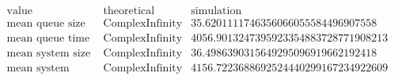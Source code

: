 \[\begin{array}{cccc}
 \text{value} & \text{theoretical} & \text{simulation} & \text{} \\
 \text{mean queue size} & \text{ComplexInfinity} & 35.6201111746356066055584496907558 & \text{} \\
 \text{mean queue time} & \text{ComplexInfinity} & 4056.9013247395923354883728771908213 & \text{} \\
 \text{mean system size} & \text{ComplexInfinity} & 36.4986390315649295096919662192418 & \text{} \\
 \text{mean system time} & \text{ComplexInfinity} & 4156.7223688692524440299167234922609 & \text{} \\
\end{array}\]

